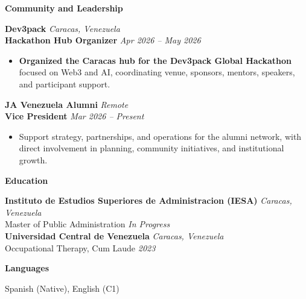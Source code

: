 \documentclass[11pt]{article}
\begin{document}
\vspace{8pt}
\begin{center}
    \textbf{Community and Leadership}
\end{center}
\vspace{-4pt}

\textbf{Dev3pack} \hfill \textit{Caracas, Venezuela} \\
\textbf{Hackathon Hub Organizer} \hfill \textit{Apr 2026 -- May 2026}
\begin{itemize}
    \item \textbf{Organized the Caracas hub for the Dev3pack Global Hackathon} focused on Web3 and AI, coordinating venue, sponsors, mentors, speakers, and participant support.
\end{itemize}

\vspace{6pt}
\textbf{JA Venezuela Alumni} \hfill \textit{Remote} \\
\textbf{Vice President} \hfill \textit{Mar 2026 -- Present}
\begin{itemize}
    \item Support strategy, partnerships, and operations for the alumni network, with direct involvement in planning, community initiatives, and institutional growth.
\end{itemize}

\vspace{8pt}
\begin{center}
    \textbf{Education}
\end{center}
\vspace{-4pt}
\textbf{Instituto de Estudios Superiores de Administracion (IESA)} \hfill \textit{Caracas, Venezuela} \\
Master of Public Administration \hfill \textit{In Progress} \\
\textbf{Universidad Central de Venezuela} \hfill \textit{Caracas, Venezuela} \\
Occupational Therapy, Cum Laude \hfill \textit{2023}

\vspace{8pt}
\begin{center}
    \textbf{Languages}
\end{center}
\vspace{-4pt}
Spanish (Native), English (C1)
\end{document}
